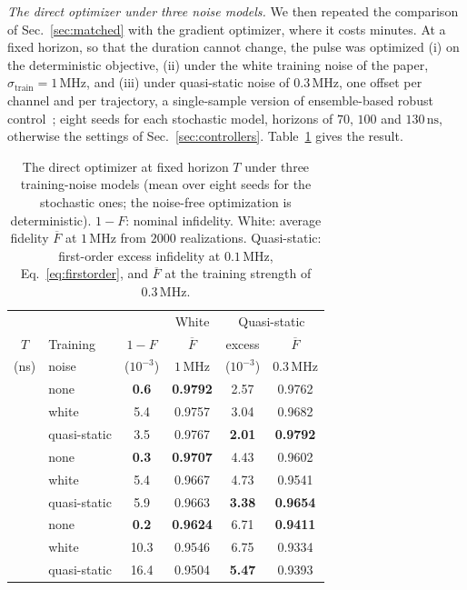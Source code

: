 \documentclass[aps,prx,twocolumn,superscriptaddress,nofootinbib,amsmath,amssymb,floatfix]{revtex4-2}
\newcommand{\Fbar}{\overline{F}}
\newcommand{\strain}{\sigma_{\mathrm{train}}}
\newcommand{\ns}{\,\mathrm{ns}}
\newcommand{\MHz}{\,\mathrm{MHz}}
\begin{document}
\emph{The direct optimizer under three noise models.} We then repeated the comparison of
Sec.~\ref{sec:matched} with the gradient optimizer, where it costs minutes. At a fixed horizon, so that
the duration cannot change, the pulse was optimized (i) on the deterministic objective, (ii) under the
white training noise of the paper, $\strain=1\MHz$, and (iii) under quasi-static noise of $0.3\MHz$, one
offset per channel and per trajectory, a single-sample version of ensemble-based robust
control~\cite{Wu2019}; eight seeds for each stochastic model, horizons of $70$, $100$ and $130\ns$,
otherwise the settings of Sec.~\ref{sec:controllers}. Table~\ref{tab:adammodels} gives the result.

\begin{table}[t]
\caption{The direct optimizer at fixed horizon $T$ under three training-noise models (mean over eight
seeds for the stochastic ones; the noise-free optimization is deterministic). $1-F$: nominal infidelity.
White: average fidelity $\Fbar$ at $1\MHz$ from $2000$ realizations. Quasi-static: first-order excess
infidelity at $0.1\MHz$, Eq.~\eqref{eq:firstorder}, and $\Fbar$ at the training strength of $0.3\MHz$.}
\label{tab:adammodels}
\footnotesize
\begin{ruledtabular}
\begin{tabular}{clcccc}
 & & & White & \multicolumn{2}{c}{Quasi-static}\\
$T$ & Training & $1-F$ & $\Fbar$ & excess & $\Fbar$\\
(ns) & noise & ($10^{-3}$) & $1\MHz$ & ($10^{-3}$) & $0.3\MHz$\\
\colrule
70  & none         & \textbf{0.6} & \textbf{0.9792} & 2.57 & 0.9762\\
    & white        & 5.4  & 0.9757 & 3.04 & 0.9682\\
    & quasi-static & 3.5  & 0.9767 & \textbf{2.01} & \textbf{0.9792}\\
\colrule
100 & none         & \textbf{0.3} & \textbf{0.9707} & 4.43 & 0.9602\\
    & white        & 5.4  & 0.9667 & 4.73 & 0.9541\\
    & quasi-static & 5.9  & 0.9663 & \textbf{3.38} & \textbf{0.9654}\\
\colrule
130 & none         & \textbf{0.2} & \textbf{0.9624} & 6.71 & \textbf{0.9411}\\
    & white        & 10.3 & 0.9546 & 6.75 & 0.9334\\
    & quasi-static & 16.4 & 0.9504 & \textbf{5.47} & 0.9393\\
\end{tabular}
\end{ruledtabular}
\end{table}
\end{document}
